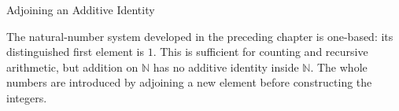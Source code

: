 
\label{sec:why-whole-numbers-are-introduced}
\begin{topicbox}{Adjoining an Additive Identity}
\begin{exposition}
The natural-number system developed in the preceding chapter is one-based:
its distinguished first element is $1$. This is sufficient for counting and
recursive arithmetic, but addition on $\mathbb{N}$ has no additive identity
inside $\mathbb{N}$. The whole numbers are introduced by adjoining a new
element before constructing the integers.
\end{exposition}
\end{topicbox}
